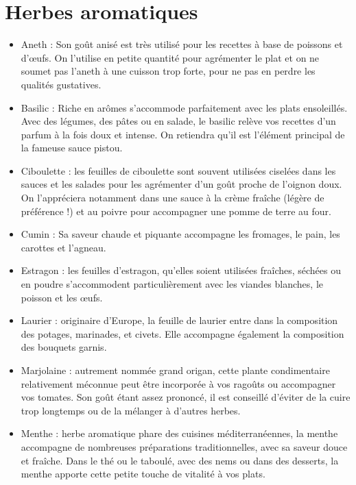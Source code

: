 \documentclass[a4paper,twoside,openright]{report}
\begin{document}
\section{Herbes aromatiques}
\begin{itemize}
\item Aneth : Son goût anisé est très utilisé pour les recettes à base de poissons et d'œufs. On l'utilise en petite quantité pour agrémenter le plat et on ne soumet pas l'aneth à une cuisson trop forte, pour ne pas en perdre les qualités gustatives.

\item Basilic : Riche en arômes s'accommode parfaitement avec les plats ensoleillés. Avec des légumes, des pâtes ou en salade, le basilic relève vos recettes d'un parfum à la fois doux et intense. On retiendra qu'il est l'élément principal de la fameuse sauce pistou.

\item Ciboulette : les feuilles de ciboulette sont souvent utilisées ciselées dans les sauces et les salades pour les agrémenter d'un goût proche de l'oignon doux. On l'appréciera notamment dans une sauce à la crème fraîche (légère de préférence !) et au poivre pour accompagner une pomme de terre au four.

\item Cumin : Sa saveur chaude et piquante accompagne les fromages, le pain, les carottes et l'agneau.

\item Estragon : les feuilles d'estragon, qu'elles soient utilisées fraîches, séchées ou en poudre s'accommodent particulièrement avec les viandes blanches, le poisson et les œufs.

\item Laurier : originaire d'Europe, la feuille de laurier entre dans la composition des potages, marinades, et civets. Elle accompagne également la composition des bouquets garnis.

\item Marjolaine : autrement nommée \og grand origan\fg, cette plante condimentaire relativement méconnue peut être incorporée à vos ragoûts ou accompagner vos tomates. Son goût étant assez prononcé, il est conseillé d'éviter de la cuire trop longtemps ou de la mélanger à d'autres herbes.

\item Menthe : herbe aromatique phare des cuisines méditerranéennes, la menthe accompagne de nombreuses préparations traditionnelles, avec sa saveur douce et fraîche. Dans le thé ou le taboulé, avec des nems ou dans des desserts, la menthe apporte cette petite touche de vitalité à vos plats.


\end{itemize}
\end{document}
